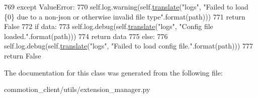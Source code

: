 \begin{DoxyCode}
769             \textcolor{keywordflow}{except} ValueError:
770                 self.log.warning(self.\hyperlink{classcommotion__client_1_1utils_1_1extension__manager_1_1ConfigManager_aa0ce09aefdd36656f0a1abfad14e9ff1}{translate}(\textcolor{stringliteral}{"logs"}, \textcolor{stringliteral}{"Failed to load \{0\} due to a non-json or
       otherwise invalid file type"}.format(path)))
771                 \textcolor{keywordflow}{return} \textcolor{keyword}{False}
772         \textcolor{keywordflow}{if} data:
773             self.log.debug(self.\hyperlink{classcommotion__client_1_1utils_1_1extension__manager_1_1ConfigManager_aa0ce09aefdd36656f0a1abfad14e9ff1}{translate}(\textcolor{stringliteral}{"logs"}, \textcolor{stringliteral}{"Config file loaded."}.format(path)))
774             \textcolor{keywordflow}{return} data
775         \textcolor{keywordflow}{else}:
776             self.log.debug(self.\hyperlink{classcommotion__client_1_1utils_1_1extension__manager_1_1ConfigManager_aa0ce09aefdd36656f0a1abfad14e9ff1}{translate}(\textcolor{stringliteral}{"logs"}, \textcolor{stringliteral}{"Failed to load config file."}.format(path)))
777             \textcolor{keywordflow}{return} \textcolor{keyword}{False}
\end{DoxyCode}


The documentation for this class was generated from the following file\+:\begin{DoxyCompactItemize}
\item 
commotion\+\_\+client/utils/extension\+\_\+manager.\+py\end{DoxyCompactItemize}
